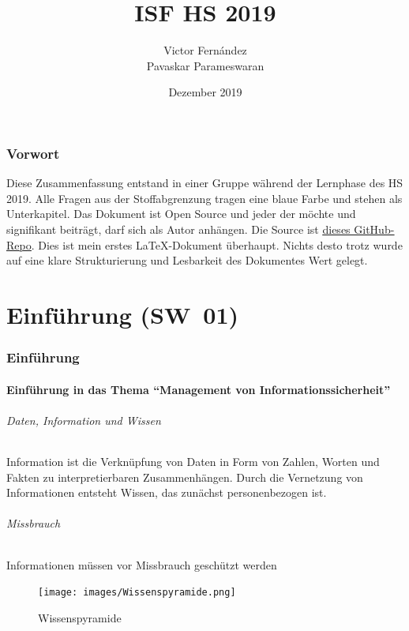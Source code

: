 \documentclass[10pt,a4paper]{article}
\title{ISF HS 2019}
\author{Victor Fernández\\Pavaskar Parameswaran}
\date{Dezember 2019}
\begin{document}
\maketitle
\thispagestyle{empty}
\section*{Vorwort}Diese Zusammenfassung entstand in einer Gruppe während der Lernphase des HS 2019. Alle Fragen aus der Stoffabgrenzung tragen eine {\color{dunkelblau}blaue Farbe} und stehen als Unterkapitel. Das Dokument ist Open Source und jeder der möchte und signifikant beiträgt, darf sich als Autor anhängen. Die Source ist \underline{\href{https://github.com/vigi86/HSLU_Zusammenfassungen/tree/master/ISF_HS19}{dieses GitHub-Repo}}. Dies ist mein erstes \LaTeX{}-Dokument überhaupt. Nichts desto trotz wurde auf eine klare Strukturierung und Lesbarkeit des Dokumentes Wert gelegt.
\tableofcontents
\thispagestyle{empty}
\pagebreak

\part{Einführung (SW~01)}
\section{Einführung}
\subsection*{Einführung in das Thema "`Management von Informationssicherheit"'}
\paragraph*{Daten, Information und Wissen}
Information ist die Verknüpfung von Daten in Form von Zahlen, Worten und Fakten zu interpretierbaren Zusammenhängen.
Durch die Vernetzung von Informationen entsteht Wissen, das zunächst personenbezogen ist.
\paragraph*{Missbrauch}Informationen müssen vor Missbrauch geschützt werden
\begin{figure}[ht]
    \begin{center}
    \texttt{[image: images/Wissenspyramide.png]}
    \caption{Wissenspyramide}
    \label{Wissenspyramide}
    \end{center}
\end{figure}
\end{document}
